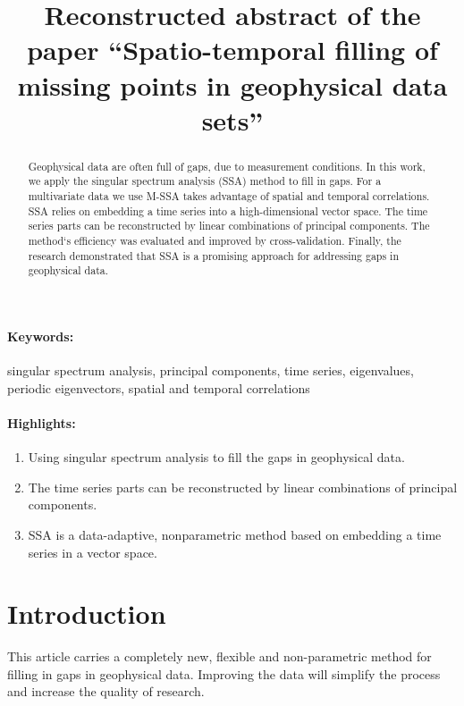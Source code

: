 \documentclass[12pt]{article}
\title{Reconstructed abstract of the paper ``Spatio-temporal filling of missing points in geophysical data sets''}
\date{}
\begin{document}
\maketitle

\begin{abstract}

Geophysical data are often full of gaps, due to measurement conditions.  In this work, we apply the singular spectrum analysis (SSA) method to fill in gaps. For a multivariate data we use M-SSA takes advantage of spatial and temporal correlations. SSA relies on embedding a time series into a high-dimensional vector space. The time series parts can be reconstructed by linear combinations of principal components. The method`s efficiency was evaluated and improved by cross-validation. Finally, the research demonstrated that SSA is a  promising approach for addressing gaps in geophysical data.



\end{abstract}
\paragraph{Keywords:} singular spectrum analysis, principal components, time series, eigenvalues, periodic eigenvectors, spatial and temporal correlations
 

\paragraph{Highlights:}
\begin{enumerate}
\item Using singular spectrum analysis to fill the gaps in geophysical data.
\item The time series parts can be reconstructed by linear combinations of principal components.
\item SSA is a data-adaptive, nonparametric method based on embedding a time series in a vector space.
\end{enumerate}

\section{Introduction}
This article\cite{kondrashov2006spatio} carries a completely new, flexible and non-parametric method for filling in gaps in geophysical data. Improving the data will simplify the process and increase the quality of research. 



\end{document}
